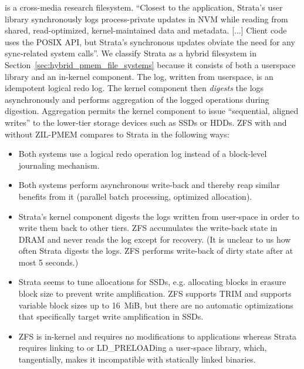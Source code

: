 \documentclass[12pt,a4paper,twoside]{book}
\begin{document}
 is a cross-media research filesystem.
“Closest to the application, Strata’s user library synchronously logs process-private updates in NVM while reading from shared, read-optimized, kernel-maintained data and metadata.
    [...]
Client code uses the POSIX API, but Strata’s synchronous updates obviate the need for any sync-related system calls”.
We classify Strata as a hybrid filesystem in Section~\ref{sec:hybrid_pmem_file_systems} because it consists of both a userspace library and an in-kernel component.
The log, written from userspace, is an idempotent logical redo log.
The kernel component then \textit{digests} the logs asynchronously and performs aggregation of the logged operations during digestion.
Aggregation permits the kernel component to issue “sequential, aligned writes” to the lower-tier storage devices such as SSDs or HDDs.
ZFS with and without ZIL-PMEM compares to Strata in the following ways:
\begin{itemize}[noitemsep,beginpenalty=100000,midpenalty=100000]
    \item Both systems use a logical redo operation log instead of a block-level journaling mechanism.
    \item Both systems perform asynchronous write-back and thereby reap similar benefits from it (parallel batch processing, optimized allocation).
    \item Strata’s kernel component digests the logs written from user-space in order to write them back to other tiers.
          ZFS accumulates the write-back state in DRAM and never reads the log except for recovery.
          (It is unclear to us how often Strata digests the logs. ZFS performs write-back of dirty state after at most 5 seconds.)
    \item Strata seems to tune allocations for SSDs, e.g. allocating blocks in erasure block size to prevent write amplification.
          ZFS supports TRIM and supports variable block sizes up to 16~MiB, but there are no automatic optimizations that specifically target write amplification in SSDs.
    \item ZFS is in-kernel and requires no modifications to applications whereas Strata requires linking to or LD\_PRELOADing a user-space library, which, tangentially, makes it incompatible with statically linked binaries.
\end{itemize}
\end{document}
